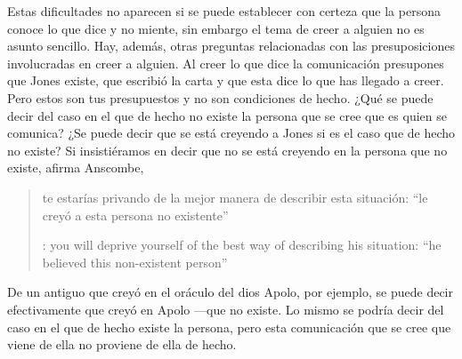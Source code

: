 Estas dificultades no aparecen si se puede establecer con certeza que la persona conoce lo que dice y no miente, sin embargo el tema de creer a alguien no es asunto sencillo. Hay, además, otras preguntas relacionadas con las presuposiciones involucradas en creer a alguien. Al creer lo que dice la comunicación presupones que Jones existe, que escribió la carta y que esta dice lo que has llegado a creer. Pero estos son tus presupuestos y no son condiciones de hecho. ¿Qué se puede decir del caso en el que de hecho no existe la persona que se cree que es quien se comunica? ¿Se puede decir que se está creyendo a Jones si es el caso que de hecho no existe? Si insistiéramos en decir que no se está creyendo en la persona que no existe, afirma Anscombe, \blockquote[{\cite[117]{anscombe1981erp:faith}}: you will deprive yourself of the best way of describing his situation: ``he believed this non-existent person'']{te estarías privando de la mejor manera de describir esta situación: ``le creyó a esta persona no existente''}. De un antiguo que creyó en el oráculo del dios Apolo, por ejemplo, se puede decir efectivamente que creyó en Apolo ---que no existe. Lo mismo se podría decir del caso en el que de hecho existe la persona, pero esta comunicación que se cree que viene de ella no proviene de ella de hecho.

